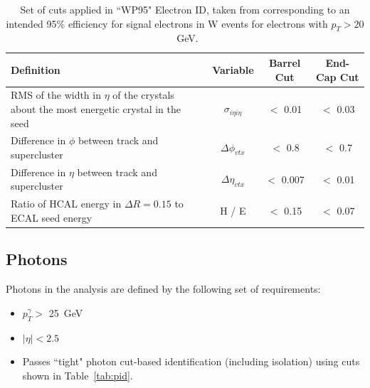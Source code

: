 \begin{table}[htbp]
\centering
\begin{tabular}{ m{6.9cm} c c c}
\hline
\hline
 \centering Definition & Variable & Barrel Cut & End-Cap Cut \\
\hline
\hline
RMS of the width in $\eta$ of the crystals about the most energetic crystal in the seed& $\sigma_{i \eta i \eta}$ & $<$ 0.01 & $<$ 0.03\\
Difference in $\phi$ between track and supercluster&$\Delta \phi_{vtx}$& $<$ 0.8 & $<$ 0.7 \\
Difference in $\eta$ between track and supercluster& $\Delta \eta_{vtx}$& $<$ 0.007 & $<$ 0.01\\
Ratio of HCAL energy in $\Delta R = 0.15$ to ECAL seed energy & H / E & $<$ 0.15 & $<$ 0.07\\
\hline
\end{tabular}
\caption{\label{tab:eid} Set of cuts applied in ``WP95" Electron ID, taken from \cite{AN-10-116} corresponding to an intended 95\% efficiency for signal electrons in W events for electrons with $p_{T} > 20$~GeV.}
\end{table}
\subsection{Photons}

Photons in the analysis are defined by the following set of requirements:
\begin{itemize}
\item $p_{T}^{\gamma} > $ 25~GeV
\item $|\eta| < 2.5$
\item Passes ``tight" photon cut-based identification (including isolation) using cuts shown in Table~\ref{tab:pid}.
\end{itemize}


